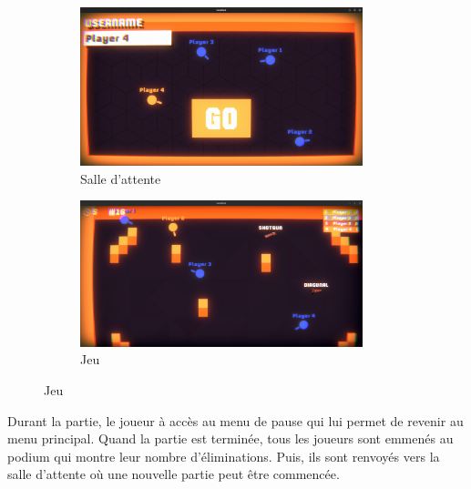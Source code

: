 \documentclass[a4paper]{article}
\begin{document}
\begin{figure}[h]
    \begin{subfigure}{0.5\textwidth}
        \includegraphics[width=0.9\textwidth]{images/game/waiting_room.png}
        \caption{Salle d'attente}
        \label{fig:waiting_room}
    \end{subfigure}
        \begin{subfigure}{0.5\textwidth}
        \includegraphics[width=0.9\textwidth]{images/game/game.png}
        \caption{Jeu}
        \label{fig:jeu}
    \end{subfigure}
\end{figure}
Durant la partie, le joueur à accès au menu de pause qui lui permet de revenir au menu principal. Quand la partie est terminée, tous les joueurs sont emmenés au podium qui montre leur nombre d'éliminations. Puis, ils sont renvoyés vers la salle d'attente où une nouvelle partie peut être commencée.
\end{document}
